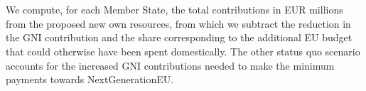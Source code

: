 \documentclass[a4paper, 11pt]{article}
\begin{document}
\section{\color{C2hi}{End the Aviation VAT Exemption}}%


\clearpage
\color{black}
\vspace*{3cm}
\renewcommand{\tablecaption}{Member State's contribution from the proposed new own resources in EUR millions.}

\clearpage
\vspace*{3cm}

\renewcommand{\tablescaption}{Member State's contribution from the proposed new own resources relative to its GNI, expressed in parts per million.}


\clearpage
\vspace*{3cm}
\renewcommand{\tablescenariocaption}{Two scenarios}

\footnotesize We compute, for each Member State, the total contributions in EUR millions from the proposed new own resources, from which we subtract the reduction in the GNI contribution and the share corresponding to the additional EU budget that could otherwise have been spent domestically.
The other status quo scenario accounts for the increased GNI contributions needed to make the minimum payments towards NextGenerationEU.
\end{document}
